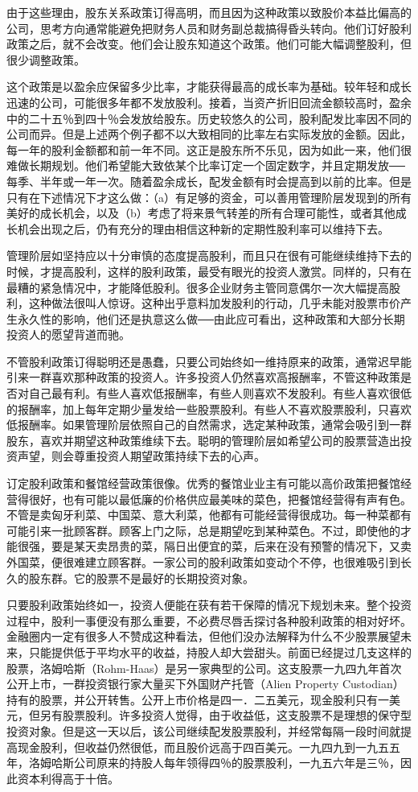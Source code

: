 \documentclass[UTF8,a4paper,zihao=-4,fontset = windows]{ctexart} %
\begin{document}
由于这些理由，股东关系政策订得高明，而且因为这种政策以致股价本益比偏高的公司，思考方向通常能避免把财务人员和财务副总裁搞得昏头转向。他们订好股利政策之后，就不会改变。他们会让股东知道这个政策。他们可能大幅调整股利，但很少调整政策。

这个政策是以盈余应保留多少比率，才能获得最高的成长率为基础。较年轻和成长迅速的公司，可能很多年都不发放股利。接着，当资产折旧回流金额较高时，盈余中的二十五％到四十％会发放给股东。历史较悠久的公司，股利配发比率因不同的公司而异。但是上述两个例子都不以大致相同的比率左右实际发放的金额。因此，每一年的股利金额都和前一年不同。这正是股东所不乐见，因为如此一来，他们很难做长期规划。他们希望能大致依某个比率订定一个固定数字，并且定期发放──每季、半年或一年一次。随着盈余成长，配发金额有时会提高到以前的比率。但是只有在下述情况下才这么做：（a）有足够的资金，可以善用管理阶层发现到的所有美好的成长机会，以及（b）考虑了将来景气转差的所有合理可能性，或者其他成长机会出现之后，仍有充分的理由相信这种新的定期性股利率可以维持下去。

管理阶层如坚持应以十分审慎的态度提高股利，而且只在很有可能继续维持下去的时候，才提高股利，这样的股利政策，最受有眼光的投资人激赏。同样的，只有在最糟的紧急情况中，才能降低股利。很多企业财务主管同意偶尔一次大幅提高股利，这种做法很叫人惊讶。这种出乎意料加发股利的行动，几乎未能对股票市价产生永久性的影响，他们还是执意这么做──由此应可看出，这种政策和大部分长期投资人的愿望背道而驰。

不管股利政策订得聪明还是愚蠢，只要公司始终如一维持原来的政策，通常迟早能引来一群喜欢那种政策的投资人。许多投资人仍然喜欢高报酬率，不管这种政策是否对自己最有利。有些人喜欢低报酬率，有些人则喜欢不发股利。有些人喜欢很低的报酬率，加上每年定期少量发给一些股票股利。有些人不喜欢股票股利，只喜欢低报酬率。如果管理阶层依照自己的自然需求，选定某种政策，通常会吸引到一群股东，喜欢并期望这种政策维续下去。聪明的管理阶层如希望公司的股票营造出投资声望，则会尊重投资人期望政策持续下去的心声。

订定股利政策和餐馆经营政策很像。优秀的餐馆业业主有可能以高价政策把餐馆经营得很好，也有可能以最低廉的价格供应最美味的菜色，把餐馆经营得有声有色。不管是卖匈牙利菜、中国菜、意大利菜，他都有可能经营得很成功。每一种菜都有可能引来一批顾客群。顾客上门之际，总是期望吃到某种菜色。不过，即使他的才能很强，要是某天卖昂贵的菜，隔日出便宜的菜，后来在没有预警的情况下，又卖外国菜，便很难建立顾客群。一家公司的股利政策如变动个不停，也很难吸引到长久的股东群。它的股票不是最好的长期投资对象。

只要股利政策始终如一，投资人便能在获有若干保障的情况下规划未来。整个投资过程中，股利一事便没有那么重要，不必费尽唇舌探讨各种股利政策的相对好坏。金融圈内一定有很多人不赞成这种看法，但他们没办法解释为什么不少股票展望未来，只能提供低于平均水平的收益，持股人却大尝甜头。前面已经提过几支这样的股票，洛姆哈斯（Rohm-Haas）是另一家典型的公司。这支股票一九四九年首次公开上市，一群投资银行家大量买下外国财产托管（Alien Property Custodian）持有的股票，并公开转售。公开上市价格是四一．二五美元，现金股利只有一美元，但另有股票股利。许多投资人觉得，由于收益低，这支股票不是理想的保守型投资对象。但是这一天以后，该公司继续配发股票股利，并经常每隔一段时间就提高现金股利，但收益仍然很低，而且股价远高于四百美元。一九四九到一九五五年，洛姆哈斯公司原来的持股人每年领得四％的股票股利，一九五六年是三％，因此资本利得高于十倍。
\end{document}

